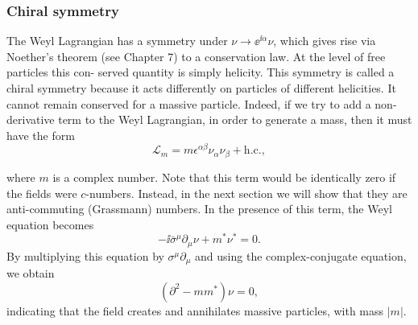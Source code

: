 \subsubsection{Chiral symmetry}

The Weyl Lagrangian has a symmetry under $\nu\to\ee^{\ii\alpha}\nu$, which gives rise via Noether’s
theorem (see Chapter 7) to a conservation law. At the level of free particles this con-
served quantity is simply helicity. This symmetry is called a chiral symmetry because
it acts differently on particles of different helicities. It cannot remain conserved for a
massive particle. Indeed, if we try to add a non-derivative term to the Weyl Lagrangian,
in order to generate a mass, then it must have the form
\begin{equation*}
  \mathcal{L}_m=m\epsilon^{\alpha\beta}\nu_\alpha\nu_\beta+\mathrm{h.c.},
\end{equation*}

where $m$ is a complex number. Note that this term would be identically zero if the fields
were $c$-numbers. Instead, in the next section we will show that they are anti-commuting
(Grassmann) numbers. In the presence of this term, the Weyl equation becomes
\begin{equation*}
  -\ii\bar\sigma^\mu\partial_\mu\nu+m^*\nu^*=0.
\end{equation*}
By multiplying this equation by $\sigma^\mu\partial_\mu$ and using the complex-conjugate equation, we
obtain
\begin{equation*}
  (\partial^2-mm^*)\nu=0,
\end{equation*}
indicating that the field creates and annihilates massive particles, with mass $|m|$.

